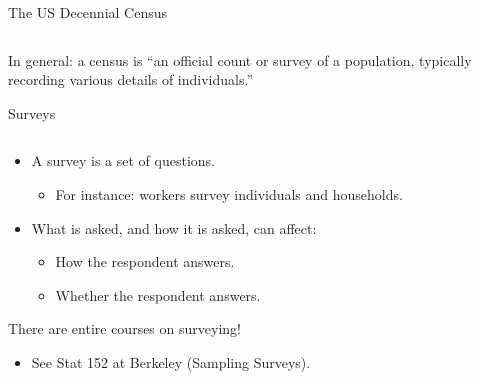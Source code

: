 \documentclass[aspectratio=169]{../latex_main/tntbeamer}  %
\begin{document}
\begin{frame}{The US Decennial Census}
\begin{columns}
\begin{column}{.4\textwidth}
	         \end{column}
	         
	         
	         
	     \end{columns}
	     In general: \alert{a census is “an official count or survey of a population, typically recording various details of individuals.”}
	\end{frame}
	
	\begin{frame}{Surveys}
	    \begin{columns}
	         \begin{column}{.4\textwidth}
	         \begin{itemize}
	             \item A survey is a set of questions.
	             \begin{itemize}
	                 \item For instance: workers survey individuals and households.
	             \end{itemize}
	             \item What is asked, and how it is asked, can affect:
	             \begin{itemize}
	                 \item How the respondent answers.
	                 \item Whether the respondent answers.
	             \end{itemize}
	         \end{itemize}
	         There are entire courses on surveying!
            \begin{itemize}
                \item See Stat 152 at Berkeley (Sampling Surveys).
            \end{itemize}


\end{column}
\end{columns}
\end{frame}
\end{document}
